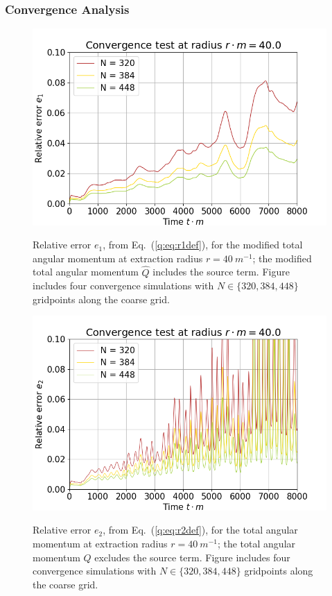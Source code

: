 \subsubsection{Convergence Analysis}\label{q:sect:conv}

\begin{figure}[h]
{\includegraphics[width=0.65\columnwidth]{png/paper_conv40_2.png}}
\caption{ Relative error $e_1$, from Eq.~(\ref{q:eq:r1def}), for the modified total angular momentum at extraction radius $r=40 ~m^{-1}$; the modified total angular momentum $\hat{Q}$ includes the source term. Figure includes four convergence simulations with $N\in\{320,384,448\}$ gridpoints along the coarse grid.}
\label{q:fig:r1}
\end{figure}
\begin{figure}[h]
{\includegraphics[width=0.65\columnwidth]{png/paper_conv40.png}}
\caption{ Relative error $e_2$, from Eq.~(\ref{q:eq:r2def}), for the total angular momentum at extraction radius $r=40 ~m^{-1}$; the total angular momentum ${Q}$ excludes the source term. Figure includes four convergence simulations with $N\in\{320,384,448\}$ gridpoints along the coarse grid.} 
\label{q:fig:r2}
\end{figure}

